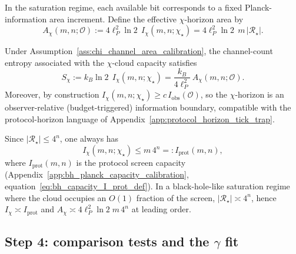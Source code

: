 \begin{assumption}\label{ass:chi_channel_area_calibration}
\MatchTag In the saturation regime, each available bit corresponds to a fixed Planck-information area increment.
Define the effective $\chi$-horizon area by
\[
A_{\chi}(m,n;\mathcal O)
:= 4\ell_P^2\ln 2\;\, I_{\chi}(m,n;\chi_\star)
= 4\ell_P^2\ln 2\;\, m\,|\mathcal R_\star|.
\]
\end{assumption}

\begin{remark}\label{prop:chi_budget_area_law}
\InterfaceTag Under Assumption~\ref{ass:chi_channel_area_calibration}, the channel-count entropy associated with the $\chi$-cloud capacity satisfies
\[
S_{\chi}
:= k_B\ln 2\;\, I_{\chi}(m,n;\chi_\star)
= \frac{k_B}{4\ell_P^2}\,A_{\chi}(m,n;\mathcal O).
\]
Moreover, by construction $I_{\chi}(m,n;\chi_\star)\ge c\,I_{\mathrm{obs}}(\mathcal O)$, so the $\chi$-horizon is an observer-relative (budget-triggered) information boundary, compatible with the protocol-horizon language of Appendix~\ref{app:protocol_horizon_tick_trap}.
\end{remark}

\begin{remark}\label{rem:chi_cloud_vs_screen_capacity}
Since $|\mathcal R_\star|\le 4^n$, one always has
\[
I_{\chi}(m,n;\chi_\star)\le m\,4^n=:I_{\mathrm{prot}}(m,n),
\]
where $I_{\mathrm{prot}}(m,n)$ is the protocol screen capacity (Appendix~\ref{app:bh_planck_capacity_calibration}, equation~\eqref{eq:bh_capacity_I_prot_def}).
In a black-hole-like saturation regime where the cloud occupies an $O(1)$ fraction of the screen, $|\mathcal R_\star|\asymp 4^n$, hence $I_{\chi}\asymp I_{\mathrm{prot}}$ and $A_{\chi}\asymp 4\ell_P^2\ln 2\; m\,4^n$ at leading order.
\end{remark}

\subsection{Step 4: comparison tests and the \texorpdfstring{$\gamma$}{gamma} fit}
\label{subsec:chi_step4_tests}

